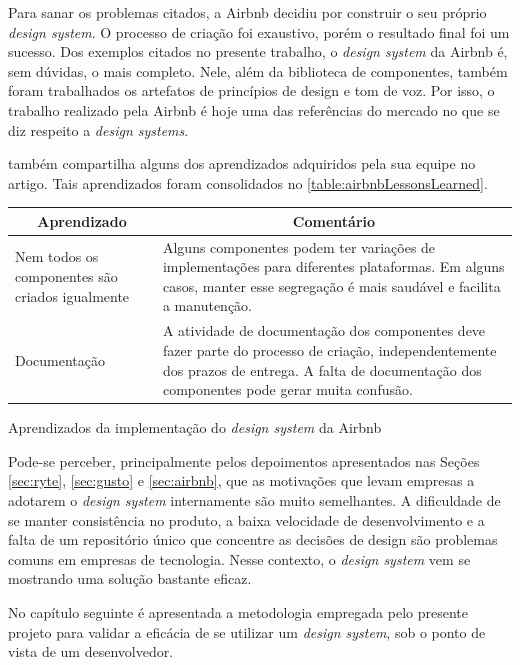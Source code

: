 Para sanar os problemas citados, a Airbnb decidiu por construir o seu próprio \textit{design system}. O processo de criação foi exaustivo, porém o resultado final foi um sucesso. Dos exemplos citados no presente trabalho, o \textit{design system} da Airbnb é, sem dúvidas, o mais completo. Nele, além da biblioteca de componentes, também foram trabalhados os artefatos de princípios de design e tom de voz. Por isso, o trabalho realizado pela Airbnb é hoje uma das referências do mercado no que se diz respeito a \textit{design systems}.

 também compartilha alguns dos aprendizados adquiridos pela sua equipe no artigo. Tais aprendizados foram consolidados no \autoref{table:airbnbLessonsLearned}.

\begin{quadro}
\centering
\begin{tabular}{|m{4cm}|m{10cm}|} \hline

	\multicolumn{1}{|c|}{\bfseries Aprendizado} & \multicolumn{1}{c|}{\bfseries Comentário} \\\hline
	
	 Nem todos os componentes são criados igualmente & Alguns componentes podem ter variações de implementações para diferentes plataformas. Em alguns casos, manter esse segregação é mais saudável e facilita a manutenção. \\\hline
	 
	 Documentação & A atividade de documentação dos componentes deve fazer parte do processo de criação, independentemente dos prazos de entrega. A falta de documentação dos componentes pode gerar muita confusão. \\\hline
    
\end{tabular}
\caption{Aprendizados da implementação do \textit{design system} da Airbnb}
\label{table:airbnbLessonsLearned}
\end{quadro}

Pode-se perceber, principalmente pelos depoimentos apresentados nas Seções \ref{sec:ryte}, \ref{sec:gusto} e \ref{sec:airbnb}, que as motivações que levam empresas a adotarem o \textit{design system} internamente são muito semelhantes. A dificuldade de se manter consistência no produto, a baixa velocidade de desenvolvimento e a falta de um repositório único que concentre as decisões de design são problemas comuns em empresas de tecnologia. Nesse contexto, o \textit{design system} vem se mostrando uma solução bastante eficaz.

No capítulo seguinte é apresentada a metodologia empregada pelo presente projeto para validar a eficácia de se utilizar um \textit{design system}, sob o ponto de vista de um desenvolvedor.
